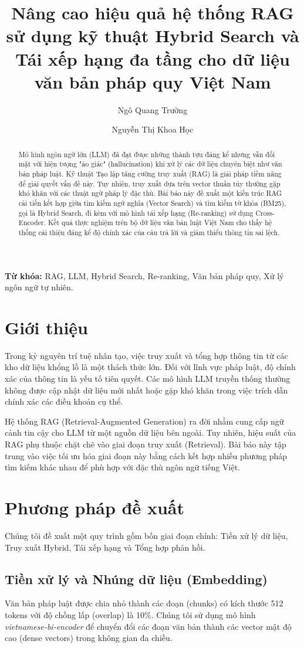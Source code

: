 \documentclass[11pt,a4paper]{article}
\title{\textbf{Nâng cao hiệu quả hệ thống RAG sử dụng kỹ thuật Hybrid Search và Tái xếp hạng đa tầng cho dữ liệu văn bản pháp quy Việt Nam}}
\author[1]{Ngô Quang Trường}
\author[2]{Nguyễn Thị Khoa Học}
\affil[1,2]{Khoa Công nghệ Thông tin, Đại học Sài Gòn}
\affil[ ]{Email: nqtruong@sgu.edu.vn}
\date{}
\begin{document}
\maketitle

\begin{abstract}
Mô hình ngôn ngữ lớn (LLM) đã đạt được những thành tựu đáng kể nhưng vẫn đối mặt với hiện tượng "ảo giác" (hallucination) khi xử lý các dữ liệu chuyên biệt như văn bản pháp luật. Kỹ thuật Tạo lập tăng cường truy xuất (RAG) là giải pháp tiềm năng để giải quyết vấn đề này. Tuy nhiên, truy xuất dựa trên vector thuần túy thường gặp khó khăn với các thuật ngữ pháp lý đặc thù. Bài báo này đề xuất một kiến trúc RAG cải tiến kết hợp giữa tìm kiếm ngữ nghĩa (Vector Search) và tìm kiếm từ khóa (BM25), gọi là Hybrid Search, đi kèm với mô hình tái xếp hạng (Re-ranking) sử dụng Cross-Encoder. Kết quả thực nghiệm trên bộ dữ liệu văn bản luật Việt Nam cho thấy hệ thống cải thiện đáng kể độ chính xác của câu trả lời và giảm thiểu thông tin sai lệch.
\end{abstract}

\textbf{Từ khóa:} RAG, LLM, Hybrid Search, Re-ranking, Văn bản pháp quy, Xử lý ngôn ngữ tự nhiên.

\section{Giới thiệu}
Trong kỷ nguyên trí tuệ nhân tạo, việc truy xuất và tổng hợp thông tin từ các kho dữ liệu khổng lồ là một thách thức lớn. Đối với lĩnh vực pháp luật, độ chính xác của thông tin là yếu tố tiên quyết. Các mô hình LLM truyền thống thường không được cập nhật dữ liệu mới nhất hoặc gặp khó khăn trong việc trích dẫn chính xác các điều khoản cụ thể.

Hệ thống RAG (Retrieval-Augmented Generation) ra đời nhằm cung cấp ngữ cảnh tin cậy cho LLM từ một nguồn dữ liệu bên ngoài. Tuy nhiên, hiệu suất của RAG phụ thuộc chặt chẽ vào giai đoạn truy xuất (Retrieval). Bài báo này tập trung vào việc tối ưu hóa giai đoạn này bằng cách kết hợp nhiều phương pháp tìm kiếm khác nhau để phù hợp với đặc thù ngôn ngữ tiếng Việt.

\section{Phương pháp đề xuất}
Chúng tôi đề xuất một quy trình gồm bốn giai đoạn chính: Tiền xử lý dữ liệu, Truy xuất Hybrid, Tái xếp hạng và Tổng hợp phản hồi.

\subsection{Tiền xử lý và Nhúng dữ liệu (Embedding)}
Văn bản pháp luật được chia nhỏ thành các đoạn (chunks) có kích thước 512 tokens với độ chồng lấp (overlap) là 10\%. Chúng tôi sử dụng mô hình \textit{vietnamese-bi-encoder} để chuyển đổi các đoạn văn bản thành các vector mật độ cao (dense vectors) trong không gian đa chiều.
\end{document}
